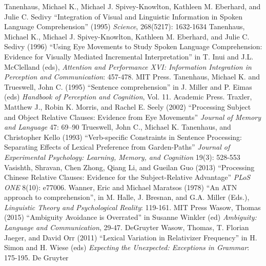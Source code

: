 \documentclass[a4paper]{article}
\begin{document}
\newline
\newline
Tanenhaus, Michael K., Michael J. Spivey-Knowlton, Kathleen M. Eberhard, and Julie C. Sedivy
``Integration of Visual and Linguistic Information in Spoken Language Comprehension''  (1995)
{\it Science}, 268(5217): 1632-1634
\newline
\newline
Tanenhaus, Michael K., Michael J. Spivey-Knowlton, Kathleen M. Eberhard, and Julie C. Sedivy (1996)  ``Using Eye Movements to Study Spoken Language Comprehension:  Evidence for Visually Mediated Incremental Interpretation''  in T. Inui and J.L. McClelland (eds), {\it Attention and Performance XVI:  Information Integration in Perception and Communication}: 457-478. MIT Press. 
\newline
\newline
Tanenhaus, Michael K. and Trueswell, John C. (1995)  ``Sentence comprehension'' in J. Miller and P. Eimas (eds) {\it Handbook of Perception and Cognition}, Vol. 11.  Academic Press.
\newline
\newline
Traxler, Matthew J., Robin K. Morris, and Rachel E. Seely (2002) ``Processing Subject and Object Relative Clauses: 
Evidence from Eye Movements'' {\it Journal of Memory and Language} 47: 69–90 
\newline
\newline
Trueswell, John C., Michael K. Tanenhaus, and Christopher Kello (1993) ``Verb-specific Constraints in Sentence Processing: Separating Effects of Lexical Preference from Garden-Paths'' {\it Journal of Experimental Psychology: Learning, Memory, and Cognition} 19(3): 528-553
\newline
\newline
Vasishth, Shravan, Chen Zhong, Qiang Li, and Gueilan Guo (2013) ``Processing Chinese Relative Clauses: Evidence for the Subject-Relative Advantage'' {\it PLoS ONE} 8(10): e77006.
\newline    
\newline
Wanner, Eric and Michael Maratsos (1978) ``An ATN approach to comprehension'', in M. Halle, J. Bresnan, and G.A. Miller (Eds.), {\it Linguistic Theory and Psychological Reality}: 119-161. MIT Press
\newline
\newline
Wasow, Thomas  (2015) ``Ambiguity Avoidance is Overrated'' in Susanne Winkler (ed) {\it Ambiguity: Language and Communication}, 29-47. DeGruyter
 \newline
\newline
Wasow, Thomas, T. Florian Jaeger, and David Orr (2011) ``Lexical Variation in Relativizer Frequency'' in H. Simon and H. Wiese (eds) {\it Expecting the Unexpected: Exceptions in Grammar}: 175-195. De Gruyter 
\end{document}
